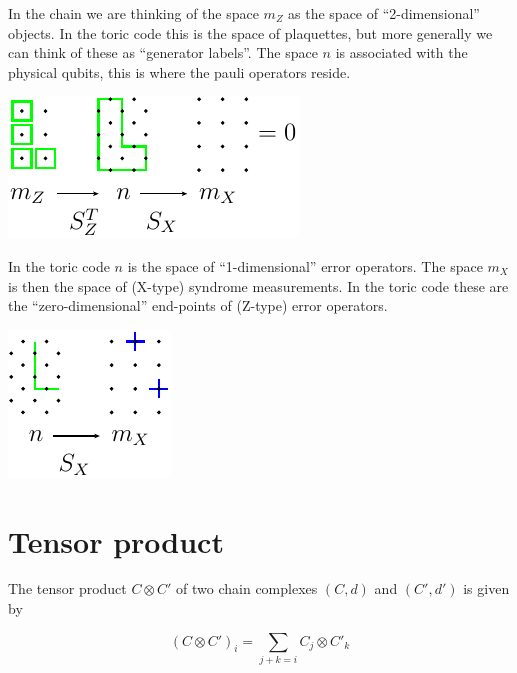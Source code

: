In the chain we are thinking of the space
$m_Z$ as the space of ``2-dimensional'' objects.
In the toric code this is the space of plaquettes,
but more generally we can think of these as ``generator
labels''. The space $n$ is associated with the physical
qubits, this is where the pauli operators reside.

\begin{center}
\includegraphics{toric_mZ.pdf}
\end{center}

In the toric code $n$ is the space of ``1-dimensional'' error
operators. The space $m_X$ is then the space of
(X-type) syndrome measurements. In the toric code
these are the ``zero-dimensional'' end-points of (Z-type)
error operators.

\begin{center}
\includegraphics{toric_mX.pdf}
\end{center}


%
%
%



\section{Tensor product}


The tensor product $C\otimes C'$ of two chain complexes $(C, d)$ and $(C', d')$
is given by

    $$ (C\otimes C')_i = \sum_{j+k=i} C_j\otimes C'_k $$


